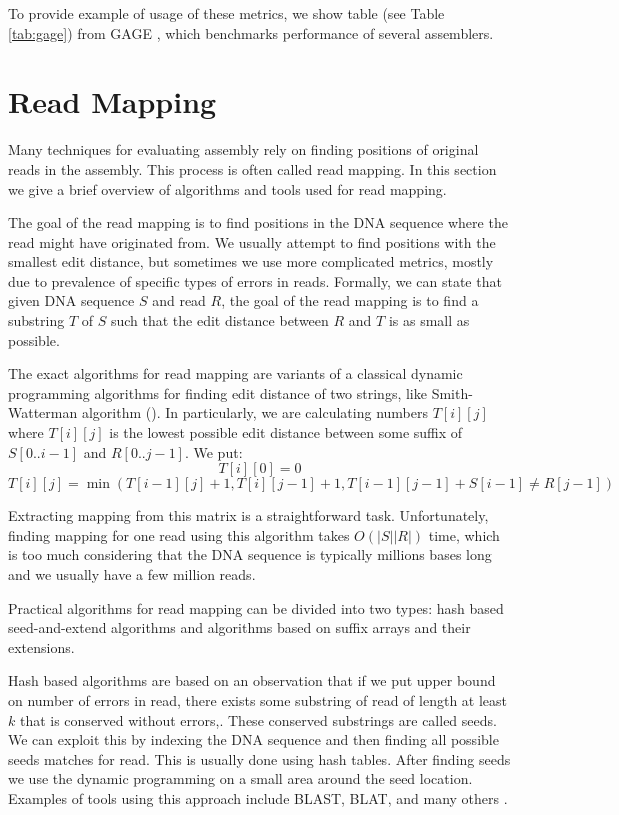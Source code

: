 To provide example of usage of these metrics, we show table (see Table \ref{tab:gage}) from GAGE \citep{gage}, which
benchmarks performance of several assemblers.

\section{Read Mapping}

Many techniques for evaluating assembly rely on finding
positions of original reads in the assembly. This process is often called read mapping.
In this section we give a brief  overview of algorithms and tools used for read mapping.

The goal of the read mapping is to find positions in the DNA sequence where the read might have
originated from. We usually attempt to find positions with the smallest edit distance, 
but sometimes we use more complicated metrics, mostly due to prevalence of specific types of errors in reads.
Formally, we can state that given DNA sequence $S$ and read $R$, the goal of the read mapping
is to find a substring $T$ of $S$ such that the edit distance between $R$ and $T$ is as small as possible.

The exact algorithms for read mapping are variants of a classical dynamic programming algorithms
for finding edit distance of two strings, like Smith-Watterman algorithm (\cite{sm}).
In particularly, we are calculating numbers $T[i][j]$ where $T[i][j]$ is the lowest possible edit
distance between some suffix of $S[0..i-1]$ and $R[0..j-1]$. 
We put:
$$T[i][0] = 0$$
$$T[i][j] = \min(T[i-1][j] + 1, T[i][j-1] + 1, T[i-1][j-1] + S[i-1] \neq R[j-1])$$

Extracting mapping from this matrix is a straightforward task.
Unfortunately, finding mapping for one read using this algorithm takes $O(|S||R|)$ time,
which is too much considering that the DNA sequence is typically millions bases long and we usually have
a few million reads.

Practical algorithms for read mapping can be divided into two types:
hash based seed-and-extend algorithms and algorithms based on suffix arrays and their extensions.

Hash based algorithms are based on an observation that if we put upper bound on number
of errors in read, there exists
some substring of read of length at least $k$ that is conserved without errors,.
These conserved substrings are called seeds. 
We can exploit this by indexing the DNA sequence 
and then finding all possible seeds matches for read.
This is usually done using hash tables. After finding seeds we use the
dynamic programming on a small area around the seed location.
Examples of tools using this approach 
include BLAST, BLAT, and many others \citep{blast,blat}.

